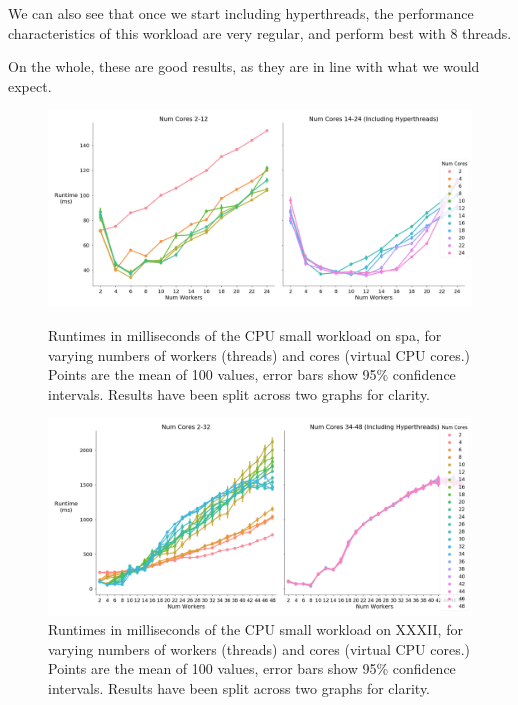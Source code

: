 We can also see that once we start including hyperthreads, the performance characteristics of this workload are very regular, and perform best with 8 threads.

On the whole, these are good results, as they are in line with what we would expect.



\begin{figure}[H]
    \vspace*{-2.5cm}
    \centerline{\includegraphics[width=1.5\textwidth]{graphics/optimal_threads/spa/optimal_threads_cpu_small.png}}
    \caption{Runtimes in milliseconds of the CPU small workload on spa, for varying numbers of workers (threads) and cores (virtual CPU cores.) Points are the mean of 100 values, error bars show 95\% confidence intervals. Results have been split across two graphs for clarity.}
    \label{fig:opt_spa_cpu_small}
    
    \centerline{\includegraphics[width=1.5\textwidth]{graphics/optimal_threads/XXXII/optimal_threads_cpu_small.png}}
    \caption{Runtimes in milliseconds of the CPU small workload on XXXII, for varying numbers of workers (threads) and cores (virtual CPU cores.) Points are the mean of 100 values, error bars show 95\% confidence intervals. Results have been split across two graphs for clarity.}
    \label{fig:opt_xxxii_cpu_small}
\end{figure}



